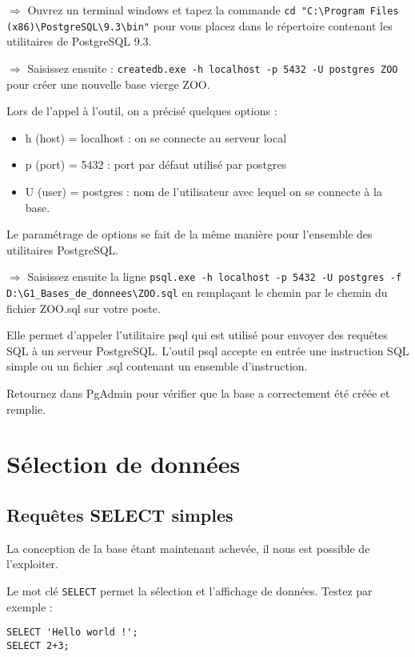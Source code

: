 \documentclass[11pt]{article}
\begin{document}
				$\Rightarrow$ Ouvrez un terminal windows et tapez la commande \lstinline{cd "C:\Program Files (x86)\PostgreSQL\9.3\bin"} pour vous placez dans le répertoire contenant les utilitaires de PostgreSQL 9.3.
				
				$\Rightarrow$ Saisissez ensuite : \lstinline{createdb.exe -h localhost -p 5432 -U postgres ZOO} pour créer une nouvelle base vierge ZOO.
				
				Lors de l'appel à l'outil, on a précisé quelques options :
				\begin{itemize}
					\item h (host) = localhost : on se connecte au serveur local
					\item p (port) = 5432 : port par défaut utilisé par postgres
					\item U (user) = postgres : nom de l'utilisateur avec lequel on se connecte à la base.
				\end{itemize}
				
				Le paramétrage de options se fait de la même manière pour l'ensemble des utilitaires PostgreSQL.
				
				$\Rightarrow$ Saisissez ensuite la ligne \lstinline{psql.exe -h localhost -p 5432 -U postgres -f D:\G1_Bases_de_donnees\ZOO.sql} en remplaçant le chemin par le chemin du fichier ZOO.sql sur votre poste.

				Elle permet d'appeler l'utilitaire psql qui est utilisé pour envoyer des requêtes SQL à un serveur PostgreSQL. L'outil psql accepte en entrée une instruction SQL simple ou un fichier .sql contenant un ensemble d'instruction. 
				
				Retournez dans PgAdmin pour vérifier que la base a correctement été créée et remplie.
				
				
		\section{Sélection de données}
			\subsection{Requêtes SELECT simples}
				La conception de la base étant maintenant achevée, il nous est possible de l'exploiter.
				
				Le mot clé \lstinline{SELECT} permet la sélection et l'affichage de données. Testez par exemple :
				\begin{lstlisting}
SELECT 'Hello world !';
SELECT 2+3;
				\end{lstlisting}
				
\end{document}
